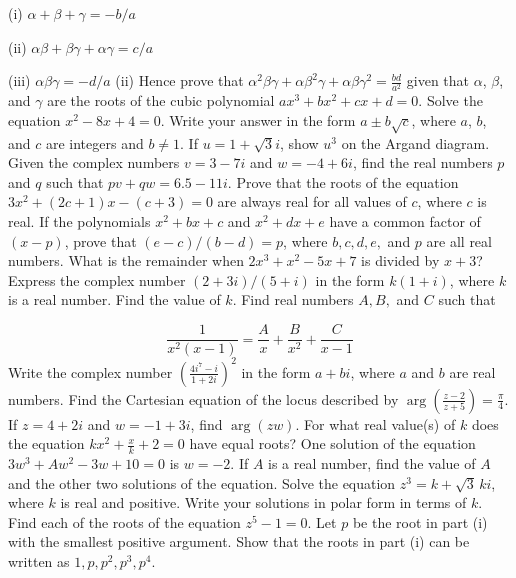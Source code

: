 \documentclass[12pt,addpoints]{exam}
\begin{document}
\begin{questions}
(i) \(\alpha + \beta + \gamma = -b/a\)

(ii) \(\alpha\beta + \beta\gamma + \alpha\gamma = c/a\)

(iii) \(\alpha\beta\gamma = -d/a\)
\fillwithlines{3cm}
\question[5] (ii) Hence prove that \(\alpha^2\beta\gamma + \alpha\beta^2\gamma + \alpha\beta\gamma^2 = \frac{bd}{a^2}\) given that \(\alpha\), \(\beta\), and \(\gamma\) are the roots of the cubic polynomial \(ax^3 + bx^2 + cx + d = 0\).
\fillwithlines{3cm}
\question[5] Solve the equation \(x^2 - 8x + 4 = 0\). Write your answer in the form \(a \pm b\sqrt{c}\), where \(a\), \(b\), and \(c\) are integers and \(b \neq 1\).
\fillwithlines{3cm}
\question[5] If \( u = 1 + \sqrt{3}i \), show \( u^3 \) on the Argand diagram.
\fillwithlines{3cm}
\question[5] Given the complex numbers \( v = 3 - 7i \) and \( w = -4 + 6i \), find the real numbers \( p \) and \( q \) such that \( pv + qw = 6.5 - 11i \).
\fillwithlines{3cm}
\question[5] Prove that the roots of the equation \( 3x^2 + (2c + 1)x - (c + 3) = 0 \) are always real for all values of \( c \), where \( c \) is real.
\fillwithlines{3cm}
\question[5] If the polynomials \(x^2 + bx + c\) and \(x^2 + dx + e\) have a common factor of \((x - p)\), prove that \((e - c) / (b - d) = p\), where \(b, c, d, e,\) and \(p\) are all real numbers.
\fillwithlines{3cm}
\question[5] What is the remainder when \(2x^3 + x^2 - 5x + 7\) is divided by \(x + 3\)?
\fillwithlines{3cm}
\question[5] Express the complex number \((2 + 3i) / (5 + i)\) in the form \(k(1 + i)\), where \(k\) is a real number. Find the value of \(k\).
\fillwithlines{3cm}
\question[5] Find real numbers \( A, B, \) and \( C \) such that

\[
\frac{1}{x^2(x-1)} = \frac{A}{x} + \frac{B}{x^2} + \frac{C}{x-1}
\]
\fillwithlines{3cm}
\question[5] Write the complex number \(\left( \frac{4i^7 - i}{1 + 2i} \right)^2\) in the form \( a + bi \), where \( a \) and \( b \) are real numbers.
\fillwithlines{3cm}
\question[5] Find the Cartesian equation of the locus described by \(\arg \left( \frac{z - 2}{z + 5} \right) = \frac{\pi}{4}\).
\fillwithlines{3cm}
\question[5] If \( z = 4 + 2i \) and \( w = -1 + 3i \), find \(\arg(zw)\).
\fillwithlines{3cm}
\question[5] For what real value(s) of \( k \) does the equation \( kx^2 + \frac{x}{k} + 2 = 0 \) have equal roots?
\fillwithlines{3cm}
\question[5] One solution of the equation \( 3w^3 + Aw^2 - 3w + 10 = 0 \) is \( w = -2 \). If \( A \) is a real number, find the value of \( A \) and the other two solutions of the equation.
\fillwithlines{3cm}
\question[5] Solve the equation \( z^3 = k + \sqrt{3} \, ki \), where \( k \) is real and positive. Write your solutions in polar form in terms of \( k \).
\fillwithlines{3cm}
\question[5] Find each of the roots of the equation \( z^5 - 1 = 0 \).
\fillwithlines{3cm}
\question[5] Let \( p \) be the root in part (i) with the smallest positive argument. Show that the roots in part (i) can be written as \( 1, p, p^2, p^3, p^4 \).


\end{questions}
\end{document}
